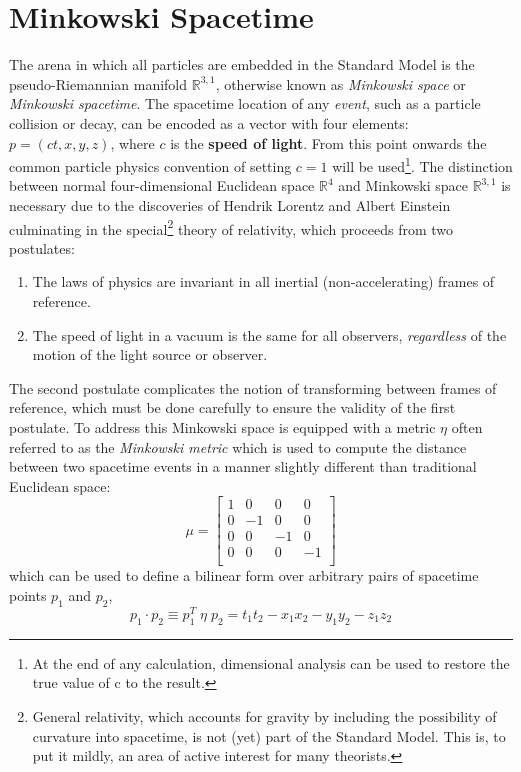 \section{Minkowski Spacetime}
\newcommand{\MinkSpace}{\ensuremath{\mathbb{R}^{3,1}}\xspace}
The arena in which all particles are embedded in the Standard Model is the pseudo-Riemannian manifold \MinkSpace, otherwise known as \textit{Minkowski space} or \textit{Minkowski spacetime}.
The spacetime location of any \textit{event}, such as a particle collision or decay, can be encoded as a vector with four elements: $p = (ct, x, y, z)$, where $c$ is the \textbf{speed of light}.
From this point onwards the common particle physics convention of setting $c = 1$ will be used\footnote{At the end of any calculation, dimensional analysis can be used to restore the true value of c to the result.}.
The distinction between normal four-dimensional Euclidean space $\mathbb{R}^4$ and Minkowski space \MinkSpace is necessary due to the discoveries of Hendrik Lorentz and Albert Einstein culminating in the special\footnote{General relativity, which accounts for gravity by including the possibility of curvature into spacetime, is not (yet) part of the Standard Model. This is, to put it mildly, an area of active interest for many theorists.} theory of relativity, which proceeds from two postulates:
\begin{enumerate}
    \item The laws of physics are invariant in all inertial (non-accelerating) frames of reference.
    \item The speed of light in a vacuum is the same for all observers, \textit{regardless} of the motion of the light source or observer.
\end{enumerate}

The second postulate complicates the notion of transforming between frames of reference, which must be done carefully to ensure the validity of the first postulate.
To address this Minkowski space is equipped with a metric $\eta$ often referred to as the \textit{Minkowski metric} which is used to compute the distance between two spacetime events in a manner slightly different than traditional Euclidean space:
\begin{equation}
\mu =
\begin{bmatrix} 
1 & 0 & 0 & 0\\
0 & -1 & 0 & 0\\
0 & 0 & -1 & 0\\
0 & 0 & 0 & -1\\
\end{bmatrix}
\end{equation}
which can be used to define a bilinear form over arbitrary pairs of spacetime points $p_1$ and $p_2$,
\begin{equation}
p_1 \cdot p_2 \equiv p_1^T\; \eta\; p_2 = t_1t_2 - x_1x_2 - y_1y_2 - z_1z_2
\end{equation}

